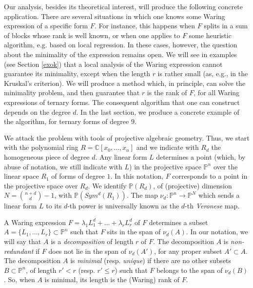 \documentclass{amsart}
\newcommand{\C}{\mathbb{C}}
\newcommand{\Pj}{\mathbb{P}}
\theoremstyle{definition}
\begin{document}
Our analysis, besides its theoretical interest, will produce the following concrete application. There are several situations in which one 
knows some Waring expression of a specific form $F$. For instance, this happens when $F$ splits in a sum 
of blocks whose rank is well known, or when one applies to $F$ some heuristic algorithm, e.g. based on local regression. In
these cases, however, the question about the minimality of the expression remains open. We will see in examples (see Section
\ref{exok}) that a local analysis of the Waring expression cannot guarantee its minimality, except when the length $r$
is rather small (as, e.g., in the Kruskal's criterion). We will produce a method which, in principle, can solve the minimality problem, 
and then guarantee that 
$r$ is the rank of $F$, for all Waring expressions of ternary forms. The consequent algorithm that one can construct
depends on the degree $d$. In the last section, we produce a concrete example of the algorithm, for ternary forms of degree
$9$.

We attack the problem with tools of  projective algebraic geometry. Thus, we start with the polynomial ring $R=
\C[x_0,\dots, x_n]$ and we indicate with $R_d$ the homogeneous piece of degree $d$. Any linear form $L$ determines
a point (which, by abuse of notation, we still indicate with $L$) in the projective space $\Pj^n$ 
over the linear space $R_1$ of forms of degree $1$. In this notation, $F$ corresponds to a point in the projective space over $R_d$.
We identify $\Pj(R_d)$, of (projective) dimension  $N=\binom{n+d} d -1$, with $\Pj(Sym^d(R_1))$. The map $\nu_d:\Pj^n\to \Pj^N$ which
sends a linear form $L$ to its $d$-th power is universally known as the $d$-th {\it Veronese} map.

A Waring expression $ F= \lambda_1L_1^d+\dots +\lambda_rL_r^d$ of $F$ determines a subset $A=\{L_1,\dots,L_r\}\subset\Pj^n$ such
that $F$ sits in the span of $\nu_d(A)$. In our notation, we will say that $A$ is a {\it decomposition} of length $r$ of $F$. The decomposition $A$ 
is {\it non-redundant} if $F$ does not lie in the span of $\nu_d(A')$, for any proper subset $A'\subset A$. The decomposition $A$ is 
{\it minimal} (resp. {\it unique}) if there are no other  subsets $B\subset \Pj^n$, of length $r'< r$ (resp. $r'\leq r$) such that $F$ belongs to the span of $\nu_d(B)$. 
So, when $A$ is minimal, its length is the (Waring) rank of $F$.
\end{document}
